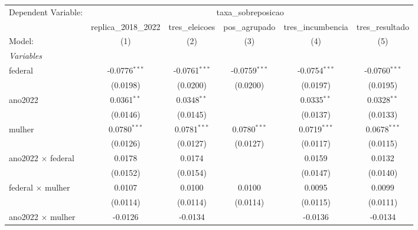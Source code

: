
\begingroup
\centering
\begin{tabular}{lccccc}
   \tabularnewline \midrule \midrule
   Dependent Variable: & \multicolumn{5}{c}{taxa\_sobreposicao}\\
                                              & replica\_2018\_2022   & tres\_eleicoes  & pos\_agrupado   & tres\_incumbencia  & tres\_resultado \\    
   Model:                                     & (1)                   & (2)             & (3)             & (4)                & (5)\\  
   \midrule
   \emph{Variables}\\
   federal                                    & -0.0776$^{***}$       & -0.0761$^{***}$ & -0.0759$^{***}$ & -0.0754$^{***}$    & -0.0760$^{***}$\\   
                                              & (0.0198)              & (0.0200)        & (0.0200)        & (0.0197)           & (0.0195)\\   
   ano2022                                    & 0.0361$^{**}$         & 0.0348$^{**}$   &                 & 0.0335$^{**}$      & 0.0328$^{**}$\\   
                                              & (0.0146)              & (0.0145)        &                 & (0.0137)           & (0.0133)\\   
   mulher                                     & 0.0780$^{***}$        & 0.0781$^{***}$  & 0.0780$^{***}$  & 0.0719$^{***}$     & 0.0678$^{***}$\\   
                                              & (0.0126)              & (0.0127)        & (0.0127)        & (0.0117)           & (0.0115)\\   
   ano2022 $\times$ federal                   & 0.0178                & 0.0174          &                 & 0.0159             & 0.0132\\   
                                              & (0.0152)              & (0.0154)        &                 & (0.0147)           & (0.0140)\\   
   federal $\times$ mulher                    & 0.0107                & 0.0100          & 0.0100          & 0.0095             & 0.0099\\   
                                              & (0.0114)              & (0.0114)        & (0.0114)        & (0.0115)           & (0.0111)\\   
   ano2022 $\times$ mulher                    & -0.0126               & -0.0134         &                 & -0.0136            & -0.0134\\   

\end{tabular}
